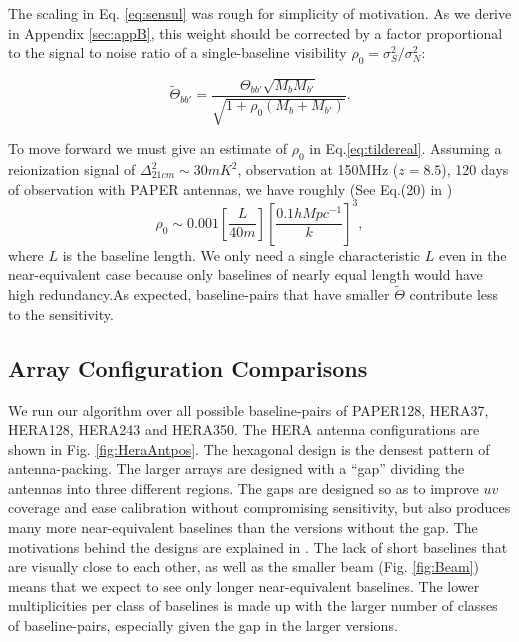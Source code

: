 \documentclass[twocolumn,apj,numberedappendix]{emulateapj}
\renewcommand\[{\begin{equation}}
\renewcommand\]{\end{equation}}
\begin{document}
The scaling in Eq. \ref{eq:sensul} was rough for simplicity of motivation. As we derive in Appendix \ref{sec:appB}, this weight should be corrected by a factor proportional to the signal to noise ratio of a single-baseline visibility $\rho_0=\sigma_S^2/\sigma_N^2$:

\begin{equation}
\label{eq:tildereal}
\widetilde{\Theta}_{bb'}=\frac{\Theta_{bb'}\sqrt{M_bM_{b'}}}{\sqrt{1 + \rho_0 \left(M_b+M_{b'} \right)}}.
\end{equation}

To move forward we must give an estimate of $\rho_0$ in Eq.\ref{eq:tildereal}. Assuming a reionization signal of $\Delta_{21cm}^2\sim 30mK^2$, observation at 150MHz ($z=8.5$), 120 days of observation with PAPER antennas, we have roughly
(See Eq.(20) in \cite{first-paper})
\begin{equation}
\rho_0 \sim 0.001\left[\frac{L}{40m}\right] \left[\frac{0.1hMpc^{-1}}{k}\right]^3, 
\end{equation}
where $L$ is the baseline length. We only need a single characteristic $L$ even in the near-equivalent case because only baselines of nearly equal length would have high redundancy.As expected, baseline-pairs that have smaller $\widetilde{\Theta}$ contribute less to the sensitivity. 

\subsection{Array Configuration Comparisons \label{sec:arrconf}}
We run our algorithm over all possible baseline-pairs of  PAPER128, HERA37, HERA128, HERA243 and HERA350. The HERA antenna configurations are shown in Fig. \ref{fig:HeraAntpos}. The  
hexagonal design is the densest pattern of antenna-packing. The larger arrays are designed with a ``gap'' dividing the antennas into three different regions. The gaps are designed so as to improve $uv$ coverage and ease calibration without compromising sensitivity, but also produces many more near-equivalent baselines than the versions without the gap. The motivations behind the designs are explained in \cite{HERAconfiguration}.  The lack of short baselines that are visually close to each other, as well as the smaller beam (Fig. \ref{fig:Beam}) means that we expect to see only longer near-equivalent baselines. The lower multiplicities per class of baselines is made up with the larger number of classes of baseline-pairs, especially given the gap in the larger versions. 
\end{document}
